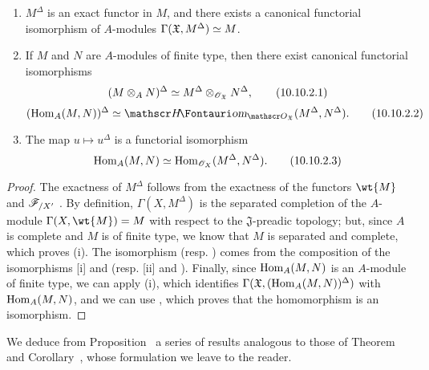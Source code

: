\begin{proposition}[10.10.2]
\label{1.10.10.2}
\medskip\noindent
\begin{enumerate}[label=\emph{(\roman*)}]
  \item $M^\Delta$ is an exact functor in $M$, and there exists a canonical functorial isomorphism of $A$-modules $\Gamma(\mathfrak{X},M^\Delta)\simeq M$.
  \item If $M$ and $N$ are $A$-modules of finite type, then there exist canonical functorial isomorphisms
    \begin{equation*}
    \label{1.10.10.2.1}
      (M\otimes_A N)^\Delta\simeq M^\Delta\otimes_{\mathscr{O}_\mathfrak{X}}N^\Delta,
      \tag{10.10.2.1}
    \end{equation*}
    \begin{equation*}
    \label{1.10.10.2.2}
      (\Hom_A(M,N))^\Delta\isoto\shHom_{\sh{O}_\mathfrak{X}}(M^\Delta,N^\Delta).
      \tag{10.10.2.2}
    \end{equation*}
  \item The map $u\mapsto u^\Delta$ is a functorial isomorphism
    \begin{equation*}
    \label{1.10.10.2.3}
      \operatorname{Hom}_A(M,N)\simeq\operatorname{Hom}_{\mathscr{O}_X}(M^\Delta,N^\Delta).
      \tag{10.10.2.3}
    \end{equation*}
\end{enumerate}
\end{proposition}

\begin{proof}
\label{proof-1.10.10.2}
The exactness of $M^\Delta$ follows from the exactness of the functors $\wt{M}$  and $\mathscr{F}_{/X'}$ .
By definition, $\Gamma(X,M^\Delta)$ is the separated completion of the $A$-module $\Gamma(X,\wt{M})=M$ with respect to the $\mathfrak{J}$-preadic topology; but, since $A$ is complete and $M$ is of finite type, we know  that $M$ is separated and complete, which proves (i).
The isomorphism  (resp. ) comes from the composition of the isomorphisms [i] and  (resp. [ii] and ).
Finally, since $\operatorname{Hom}_A(M,N)$ is an $A$-module of finite type, we can apply (i), which identifies $\Gamma(\mathfrak{X},(\operatorname{Hom}_A(M,N))^\Delta)$ with $\operatorname{Hom}_A(M,N)$, and we can use , which proves that the homomorphism  is an isomorphism.
\end{proof}

We deduce from Proposition~ a series of results analogous to those of Theorem~ and Corollary~, whose formulation we leave to the reader.

